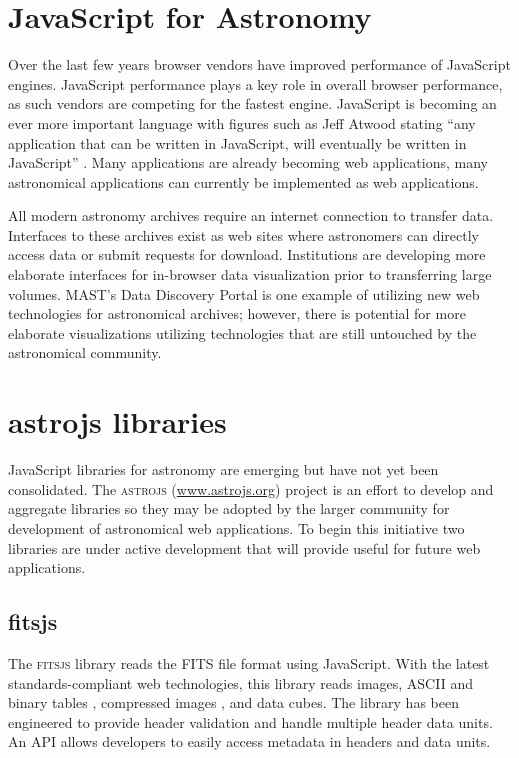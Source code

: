 \documentclass[11pt,twoside]{article}
\begin{document}
\section{JavaScript for Astronomy}

Over the last few years browser vendors have improved performance of JavaScript engines.  JavaScript performance plays a key role in overall browser performance, as such vendors are competing for the fastest engine.  JavaScript is becoming an ever more important language with figures such as Jeff Atwood stating ``any application that can be written in JavaScript, will eventually be written in JavaScript'' \citep{Atwood}.  Many applications are already becoming web applications, many astronomical applications can currently be implemented as web applications.

All modern astronomy archives require an internet connection to transfer data.  Interfaces to these archives exist as web sites where astronomers can directly access data or submit requests for download.  Institutions are developing more elaborate interfaces for in-browser data visualization prior to transferring large volumes.  MAST's Data Discovery Portal is one example of utilizing new web technologies for astronomical archives; however, there is potential for more elaborate visualizations utilizing technologies that are still untouched by the astronomical community.

\section{astrojs libraries}

JavaScript libraries for astronomy are emerging but have not yet been consolidated.  The \textsc{astrojs} (\url{www.astrojs.org}) project is an effort to develop and aggregate libraries so they may be adopted by the larger community for development of astronomical web applications.  To begin this initiative two libraries are under active development that will provide useful for future web applications.

\subsection{fitsjs}

The \textsc{fitsjs} library reads the FITS file format \citep{2010A&A...524A..42P} using JavaScript.  With the latest standards-compliant web technologies, this library reads images, ASCII and binary tables \citep{1995A&AS..113..159C}, compressed images \citep{2012arXiv1201.1336W}, and data cubes.  The library has been engineered to provide header validation and handle multiple header data units.  An API allows developers to easily access metadata in headers and data units.
\end{document}
